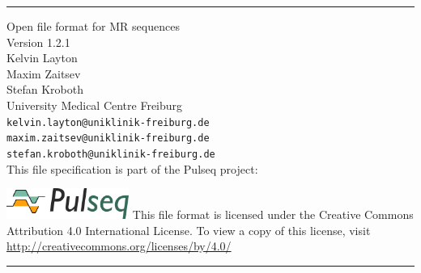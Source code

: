 \documentclass{article}
\date{}
\author{}
\def\myversionmajor{1}
\def\myversionminor{2}
\def\myversionrevision{1}
\def\myversion{\myversionmajor.\myversionminor.\myversionrevision }
\begin{document}
\begin{titlepage}
\begin{centering}
\rule{\textwidth}{5pt}\vskip1cm
\Huge{Open file format for MR sequences \\}
\vspace{1cm}
\LARGE{Version \myversion\\}
\vspace{1cm}
\large Kelvin Layton\\ Maxim Zaitsev\\ Stefan Kroboth\\
\vspace{1cm}
\large University Medical Centre Freiburg \\%
 \verb+kelvin.layton@uniklinik-freiburg.de+\\%
 \verb+maxim.zaitsev@uniklinik-freiburg.de+\\%
 \verb+stefan.kroboth@uniklinik-freiburg.de+\\%
 \vspace{1cm}
 This file specification is part of the Pulseq project:
 \vspace{0.5cm}

 \href{http://pulseq.github.io/}{\includegraphics[width=0.3\textwidth]{logo}}
 \vfill
\small This file format is licensed under the Creative Commons Attribution 4.0 International License. To view a copy of this license, visit \url{ http://creativecommons.org/licenses/by/4.0/ }\\
\rule{\textwidth}{5pt}
\end{centering}
\end{titlepage}

\newpage

\setlength\parindent{0pt}
\setlength{\parskip}{0.4\baselineskip}%

\tableofcontents

\setlength\parindent{0pt}
\setlength{\parskip}{\baselineskip}%

\newpage
\end{document}
